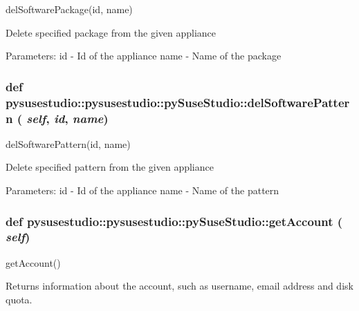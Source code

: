 \label{classpysusestudio_1_1pysusestudio_1_1py_suse_studio_a313bcab09e6ccdd4c038366949ca0010}
\begin{DoxyVerb}delSoftwarePackage(id, name)

            Delete specified package from the given appliance
            
            Parameters:
id - Id of the appliance
name - Name of the package

\end{DoxyVerb}
 \hypertarget{classpysusestudio_1_1pysusestudio_1_1py_suse_studio_af67873941ec55567bd175a77e7aa1913}{
\subsubsection[{delSoftwarePattern}]{\setlength{\rightskip}{0pt plus 5cm}def pysusestudio::pysusestudio::pySuseStudio::delSoftwarePattern ( {\em self}, \/   {\em id}, \/   {\em name})}}
\label{classpysusestudio_1_1pysusestudio_1_1py_suse_studio_af67873941ec55567bd175a77e7aa1913}
\begin{DoxyVerb}delSoftwarePattern(id, name)

            Delete specified pattern from the given appliance
            
            Parameters:
id - Id of the appliance
name - Name of the pattern

\end{DoxyVerb}
 \hypertarget{classpysusestudio_1_1pysusestudio_1_1py_suse_studio_a1ce6fe70260b86b16a349c173f15bc88}{
\subsubsection[{getAccount}]{\setlength{\rightskip}{0pt plus 5cm}def pysusestudio::pysusestudio::pySuseStudio::getAccount ( {\em self})}}
\label{classpysusestudio_1_1pysusestudio_1_1py_suse_studio_a1ce6fe70260b86b16a349c173f15bc88}
\begin{DoxyVerb}getAccount()

        Returns information about the account, such as username, email address and disk quota.
\end{DoxyVerb}
